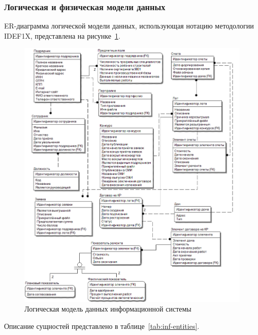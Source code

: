 \subsubsection{Логическая и физическая модели данных}

ER-диаграмма логической модели данных, использующая нотацию методологии IDEF1X, представлена на рисунке~\ref{img:inf-er}.

\begin{figure}[h!]
	\begin{center}
		\begin{minipage}[h]{\linewidth}
			\centering
			\includegraphics[width=0.85\linewidth]{images/inf-er.png}
			\caption{Логическая модель данных информационной системы}
			\label{img:inf-er}
		\end{minipage}
		\hfill
	\end{center}
\end{figure}

Описание сущностей представлено в таблице~\ref{tab:inf-entities}.

